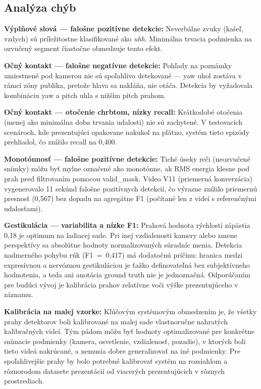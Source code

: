 \subsection{Analýza chýb}

\textbf{Výplňové slová --- falošne pozitívne detekcie:} Neverbálne zvuky (kašeľ, vzdych) sú príležitostne klasifikované ako \textit{uhh}. Minimálna trvacia podmienka na ozvučený segment čiastočne obmedzuje tento efekt.

\textbf{Očný kontakt --- falošne negatívne detekcie:} Pohľady na poznámky umiestnené pod kamerou nie sú spoľahlivo detekované --- yaw uhol zostáva v rámci zóny publika, pretože hlava sa nakláňa, nie otáča. Detekcia by vyžadovala kombináciu yaw a pitch uhla s nižším pitch prahom.

\textbf{Očný kontakt --- otočenie chrbtom, nízky recall:} Krátkodobé otočenia (menej ako minimálna doba trvania udalosti) nie sú zachytené. V testovacích scenároch, kde prezentujúci opakovane nakukol na plátno, systém tieto epizódy prehliadol, čo znížilo recall na 0,400.

\textbf{Monotónnosť --- falošne pozitívne detekcie:} Tiché úseky reči (neozvučené snímky) môžu byť mylne označené ako monotónne, ak RMS energia klesne pod prah pred filtrovaním pomocou valid\_mask. Video V11 (priemerná konverzácia) vygenerovalo 11 sekúnd falošne pozitívnych detekcií, čo výrazne znížilo priemernú presnosť (0,567) bez dopadu na agregátne F1 (počítané len z videí s referenčnými udalosťami).

\textbf{Gestikulácia --- variabilita a nízke F1:} Prahová hodnota rýchlosti zápästia 0,18 je optimum na ladiacej sade. Pri inej vzdialenosti kamery alebo zmene perspektívy sa absolútne hodnoty normalizovaných súradníc menia. Detekcia nadmerného pohybu rúk (F1~=~0,417) má dodatočnú príčinu: hranica medzi expresívnou a nervóznou gestikuláciou je ťažko definovateľná bez subjektívneho hodnotenia, a teda ani anotácia ground truth nie je jednoznačná. Odporúčaním pre budúci vývoj je kalibrácia prahov relatívne voči výške prezentujúceho v záznamu.

\textbf{Kalibrácia na malej vzorke:} Kľúčovým systémovým obmedzením je, že všetky prahy detektorov boli kalibrované na malej sade vlastnoručne nahratých kalibračných videí. Tým pádom môžu byť hodnoty optimalizované pre konkrétne snímacie podmienky (kamera, osvetlenie, vzdialenosť, pozadie), v ktorých boli tieto videá nakrúcané, a nemusia dobre generalizovať na iné podmienky. Pre spoľahlivejšie prahy by bolo potrebné kalibrovať systém na rozsiahlom a rôznorodom datasete prezentácií od viacerých prezentujúcich v rôznych prostrediach.

